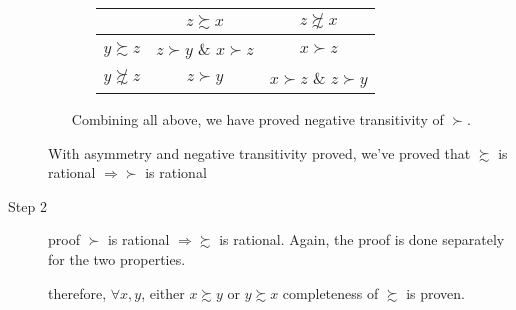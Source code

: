 \begin{description}
\begin{itemize}
\begin{enumerate}
        \begin{table}[h]
        \begin{centering}
        \begin{tabular}{ccc}
        \hline 
         & $z\succsim x$ & $z\not\succsim x$\tabularnewline
        \hline 
        $y\succsim z$ & $z\succ y$ \& $x\succ z$ & $x\succ z$\tabularnewline
        $y\not\succsim z$ & $z\succ y$ & $x\succ z$ \& $z\succ y$\tabularnewline
        \hline 
        \end{tabular}
        \par\end{centering}
        \end{table}
        
        \end{enumerate}
        Combining all above, we have proved negative transitivity of $\succ$.
        \end{itemize}
        With asymmetry and negative transitivity proved, we've proved that
        $\succsim$ is rational $\Rightarrow$$\succ$ is rational
    
    \item[Step 2] proof $\succ$ is rational $\Rightarrow$$\succsim$ is
    rational. Again, the proof is done separately for the two properties.
    therefore, $\forall x,y$, either $x\succsim y$ or $y\succsim x$ completeness of $\succsim$ is proven.


\end{description}
